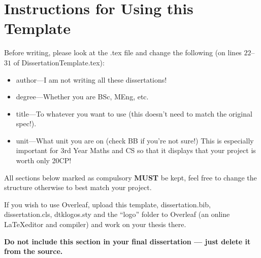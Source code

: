 \documentclass[ oneside,%
                    author={Michael Wray},
                    degree={BSc},
                     title={Some Structural Guidelines for CS Project Dissertations \\ With a Second Line Added to the Title},
                    unit={COMS30045},
                    subtitle={And Even A Fancy Subtitle}]{dissertation}
\begin{document}


\section*{Instructions for Using this Template}
\thispagestyle{empty}

Before writing, please look at the .tex file and change the following (on lines
$22$--$31$ of DissertationTemplate.tex):
\begin{itemize}
    \item author---I am not writing all these dissertations!
    \item degree---Whether you are BSc, MEng, etc.
    \item title---To whatever you want to use (this doesn't need to match the
original spec!).
    \item unit---What unit you are on (check BB if you're not sure!) This is
especially important for 3rd Year Maths and CS so that it displays that your
project is worth only 20CP!
\end{itemize}

All sections below marked as compulsory \textbf{MUST} be kept, feel free to
change the structure otherwise to best match your project.

If you wish to use Overleaf, upload this template, dissertation.bib, dissertation.cls, 
dtklogos.sty and the ``logo'' folder to Overleaf (an online \LaTeX editor and
compiler) and work on your thesis there.

\textbf{Do not include this section in your final dissertation --- just delete it from the source.}



\maketitle
\end{document}
